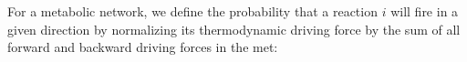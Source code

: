 For a metabolic network, we define the probability that a reaction $i$ will fire in a given direction by normalizing its thermodynamic driving force by the sum of all forward and backward driving forces in the met: